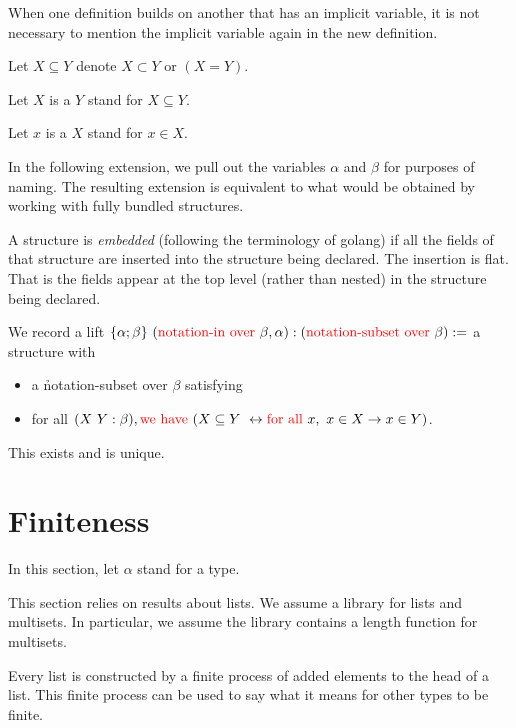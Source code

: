 \documentclass[12pt]{article}
\begin{document}
\begin{cnl}
\begin{remark}
When one definition builds on another that has an implicit variable,
it is not necessary to mention the implicit variable again in the new
definition.
\end{remark}


Let $X\subseteq Y$ denote $X\subset Y$ or $(X=Y)$.

 
Let $X$ is a  $Y$ stand for $X\subseteq Y$.  

Let $x$ is a  $X$ stand for $x\in X$.



\begin{remark}
In the following extension, we pull out the variables $\alpha$ and
$\beta$ for purposes of naming.  The resulting extension is equivalent
to what would be obtained by working with fully bundled structures.

A structure is {\it embedded} (following the terminology of golang) if
all the fields of that structure are inserted into the structure being
declared. The insertion is flat.  That is the fields appear at the top
level (rather than nested) in the structure being declared.
\end{remark}

We record a lift $\{\alpha; \beta\}\ (\h{notation-in}\ \h{over}\ \beta,\alpha) : (\h{notation-subset}\ \h{over}\ \beta) \assign$
a structure with
\begin{itemize}
\item a \h{notation-subset} over $\beta$
satisfying 
\item for all  $(X\ Y : \beta), \h{we have}\ (X \subseteq Y\ \iff 
\h{for all } x,\ x \in X \rightarrow x \in Y)$.
\end{itemize}
This exists and is unique.


\newpage
\section{Finiteness}

In this section, let $\alpha$ stand for a type.



\begin{remark}
This section relies on results about lists.  We assume a library for
lists and multisets.  In particular, we assume the library contains a
length function for multisets.

Every list is constructed by a finite process of added elements to the
head of a list.  This finite process can be used to say what it means
for other types to be finite.


\end{remark}
\end{cnl}
\end{document}
